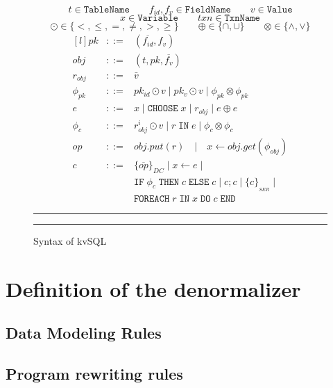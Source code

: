 \documentclass[12pt,letter]{article}
\begin{document}
\begin{figure}[h]
	$$
	t \in \texttt{TableName} \qquad 
	f_{id},f_v \in \texttt{FieldName} \qquad 
	v \in \texttt{Value} $$
	\vspace{-7mm} %
	$$\qquad
	x \in \texttt{Variable} \qquad
	txn \in \texttt{TxnName}
	$$
	\vspace{-6mm} %
	$$ \odot \in \{<,\leq,=,\neq,>,\geq\} \qquad 
	\oplus \in \{\cap,\cup\} \qquad 
	\otimes \in \{\wedge, \vee\}
	$$ 
	$$
	\begin{matrix*}[l]
		pk & ::= & (\overline{f_{id}},f_v)\\
		obj &  ::= & (t,pk,\overline{f_v}) \\
		r_{obj} &  ::= & \bar{v} \\
		\phi_{pk}  & ::= & pk_{id} \odot v \;|\; pk_{v} \odot v
		\;|\; \phi_{pk} \otimes \phi_{pk} \\
		e  & ::= & x \;|\; \texttt{CHOOSE} \; x\;|\; r_{obj} \;|\; e \oplus e\\
		\phi_{c}  & ::= & r^i_{obj}\odot v \;|\;  r\;\texttt{IN} \; e \;|\; \phi_{c} \otimes \phi_{c} \\
		op   & ::= & obj.put(r) \quad
		|\quad x\leftarrow obj.get(\phi_{obj})  \\
		c   & ::=  & \{\overline{op}\}_{DC}
		\;|\; x\leftarrow e \;|\;
		\\  & & \texttt{IF}\; \phi_c \;\texttt{THEN} \;c \;\texttt{ELSE}\; c \;|\;  c;c \;|\;
		\{c\}_{_{SER}} \;|\;
		\\  & & \texttt{FOREACH}\; r \;\texttt{IN} \; x \; \texttt{DO}\; c \;\texttt{END}
		
	\end{matrix*}
	$$
	\hrule \hrule 
\caption{Syntax of kvSQL}
\label{fig:syn}
\end{figure}


\section{Definition of the denormalizer}
\subsection{Data Modeling Rules}

\subsection{Program rewriting rules}
\end{document}
